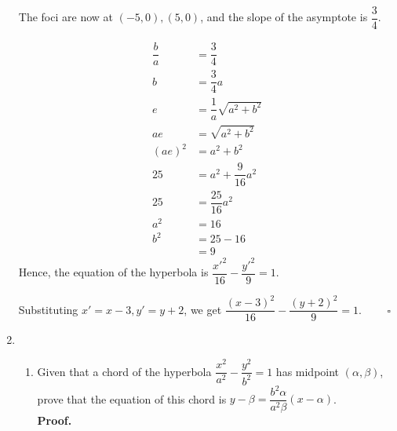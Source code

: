 \documentclass{report}
\newcommand{\proof}{\vspace{1em}\\\textbf{Proof.}}
\newcommand{\eos}{ \qquad \square}
\begin{document}
\begin{enumerate}[leftmargin=*]
          The foci are now at $(-5,0), (5,0)$, and the slope of the asymptote is
          $\dfrac{3}{4}$.

          \begin{align*}
              \dfrac{b}{a} & = \dfrac{3}{4}               \\
              b            & = \dfrac{3}{4}a              \\
              e            & = \dfrac{1}{a}\sqrt{a^2+b^2} \\
              ae           & = \sqrt{a^2+b^2}             \\
              (ae)^2       & = a^2 + b^2                  \\
              25           & = a^2 + \dfrac{9}{16}a^2     \\
              25           & = \dfrac{25}{16}a^2          \\
              a^2          & = 16                         \\
              b^2          & = 25 - 16                    \\
                           & = 9
          \end{align*}
          Hence, the equation of the hyperbola is $\dfrac{x'^2}{16}-\dfrac{y'^2}{9}=1$.

          Substituting $x' = x-3, y' = y+2$, we get
          $\dfrac{(x-3)^2}{16}-\dfrac{(y+2)^2}{9}=1$. $\eos$

          \newpage
    \item \begin{enumerate}
              \item Given that a chord of the hyperbola $\dfrac{x^2}{a^2}-\dfrac{y^2}{b^2}=1$ has
                    midpoint $(\alpha, \beta)$, prove that the equation of this chord is
                    $y-\beta=\dfrac{b^2 \alpha}{a^2 \beta}(x-\alpha)$. \proof{}


\end{enumerate}
\end{enumerate}
\end{document}
